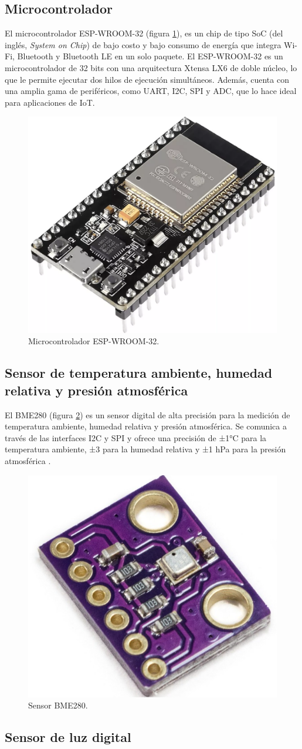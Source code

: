 \subsection{Microcontrolador}\label{sec:microcontrolador}

El microcontrolador ESP-WROOM-32 (figura \ref{fig:ESP32}), es un chip de tipo
SoC (del inglés, \textit{System on Chip}) de bajo costo y bajo consumo de energía que
integra Wi-Fi, Bluetooth y Bluetooth LE en un solo paquete. El ESP-WROOM-32
\cite{EspressifESP32WROOM} es un microcontrolador de 32 bits con una
arquitectura Xtensa LX6 de doble núcleo, lo que le permite ejecutar dos hilos
de ejecución simultáneos. Además, cuenta con una amplia gama de periféricos,
como UART, I2C, SPI y ADC, que lo hace ideal para aplicaciones de IoT.

\begin{figure}[H]
	\centering
	\includegraphics[height=.15\textwidth]{./Images/3.png}
	\caption{Microcontrolador ESP-WROOM-32.}
	\label{fig:ESP32}
\end{figure}

\subsection{Sensor de temperatura ambiente, humedad relativa y presión atmosférica}

El BME280 (figura \ref{fig:BME280}) es un sensor digital de alta precisión para
la medición de temperatura ambiente, humedad relativa y presión atmosférica. Se
comunica a través de las interfaces I2C y SPI y ofrece una precisión de ±1°C
para la temperatura ambiente, ±3\code{\%} para la humedad relativa y ±1 hPa
para la presión atmosférica \cite{BoschBME280}.

\begin{figure}[H]
	\centering
	\includegraphics[height=.15\textwidth]{./Images/4.png}
	\caption{Sensor BME280.}
	\label{fig:BME280}
\end{figure}

\subsection{Sensor de luz digital}\label{sec:BH1750}

